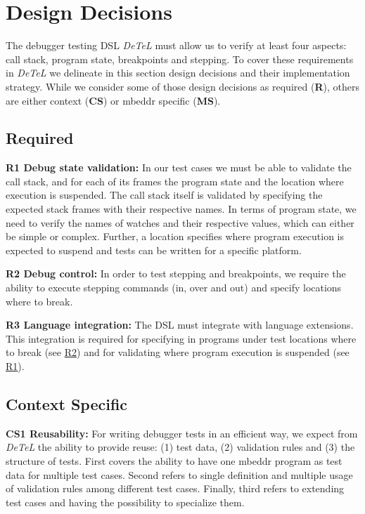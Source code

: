 \section{Design Decisions}
\label{DesignDecisions}

The debugger testing \ac{DSL} \emph{DeTeL} must allow us to verify at least
four aspects: call stack, program state, breakpoints and stepping.
To cover these requirements in \emph{DeTeL} we delineate in this section design
decisions and their implementation strategy. While we consider some of those
design decisions as required (\textbf{R}), others are either context 
(\textbf{CS}) or mbeddr specific (\textbf{MS}).

\subsection{Required}

\textbf{\label{R1}R1 Debug state validation:} In our test cases we
must be able to validate the call stack, and for each of its frames 
the program state and the location where execution is suspended. 
The call stack itself is validated by specifying the expected stack
frames with their respective names. In terms of program state, we need to verify
the names of watches and their respective values, which can either be simple
or complex. Further, a location specifies where program execution is
expected to suspend and tests can be written for a specific platform. 

\textbf{\label{R2}R2 Debug control:} In order to test stepping
and breakpoints, we require the ability to execute stepping commands
(in, over and out) and specify locations where to break.

\textbf{\label{R3}R3 Language integration:} The
\ac{DSL} must integrate with language extensions.
This integration is required for specifying in programs under test
locations where to break (see \hyperref[R2]{R2}) and for validating where
program execution is suspended (see \hyperref[R1]{R1}).

\subsection{Context Specific}

\textbf{\label{CS1}CS1 Reusability:} For writing debugger tests in
an efficient way, we expect from \emph{DeTeL} the ability to provide reuse: (1)
test data, (2) validation rules and (3) the structure of tests. First covers
the ability to have one mbeddr program as test data for multiple test cases.
Second refers to single definition and multiple usage of validation rules among
different test cases. Finally, third refers to extending test cases and
having the possibility to specialize them.

